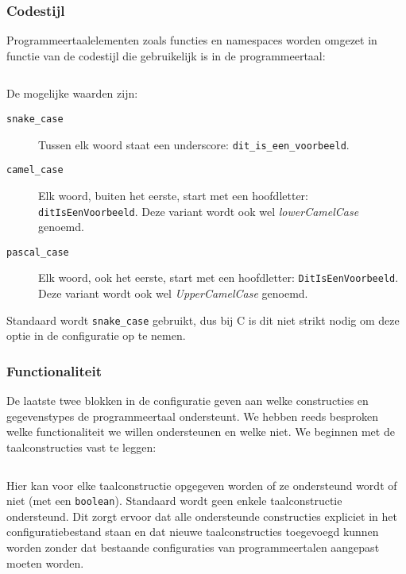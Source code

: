 \inputminted[firstline=2,lastline=14,gobble=2]{js}{sources/c-config.json}

\subsubsection{Codestijl}

Programmeertaalelementen zoals functies en namespaces worden omgezet in functie van de codestijl die gebruikelijk is in de programmeertaal:

\inputminted[firstline=15,lastline=18,gobble=2]{js}{sources/c-config.json}

De mogelijke waarden zijn:

\begin{description}
    \item[\texttt{snake\_case}] Tussen elk woord staat een underscore: \texttt{dit\_is\_een\_voorbeeld}.
    \item[\texttt{camel\_case}] Elk woord, buiten het eerste, start met een hoofdletter: \texttt{ditIsEenVoorbeeld}.
    Deze variant wordt ook wel \emph{lowerCamelCase} genoemd.
    \item[\texttt{pascal\_case}] Elk woord, ook het eerste, start met een hoofdletter: \texttt{DitIsEenVoorbeeld}.
    Deze variant wordt ook wel \emph{UpperCamelCase} genoemd.
\end{description}

Standaard wordt \texttt{snake\_case} gebruikt, dus bij C is dit niet strikt nodig om deze optie in de configuratie op te nemen.

\subsubsection{Functionaliteit}

De laatste twee blokken in de configuratie geven aan welke constructies en gegevenstypes de programmeertaal ondersteunt.
We hebben reeds besproken welke functionaliteit we willen ondersteunen en welke niet.
We beginnen met de taalconstructies vast te leggen:

\inputminted[firstline=19,lastline=27,gobble=2]{js}{sources/c-config.json}

Hier kan voor elke taalconstructie opgegeven worden of ze ondersteund wordt of niet (met een \texttt{boolean}).
Standaard wordt geen enkele taalconstructie ondersteund.
Dit zorgt ervoor dat alle ondersteunde constructies expliciet in het configuratiebestand staan en dat nieuwe taalconstructies toegevoegd kunnen worden zonder dat bestaande configuraties van programmeertalen aangepast moeten worden.

